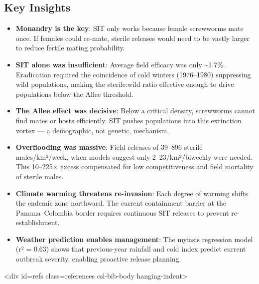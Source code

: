 \subsection{Key Insights}



\label{7549919537174593161}{}


\begin{itemize}
\item[1. ] \textbf{Monandry is the key}: SIT only works because female screwworms  mate once. If females could re-mate, sterile releases would need to  be vastly larger to reduce fertile mating probability.


\item[2. ] \textbf{SIT alone was insufficient}: Average field efficacy was only  {\textasciitilde}1.7\%. Eradication required the coincidence of cold winters  (1976–1980) suppressing wild populations, making the sterile:wild  ratio effective enough to drive populations below the Allee  threshold.


\item[3. ] \textbf{The Allee effect was decisive}: Below a critical density,  screwworms cannot find mates or hosts efficiently. SIT pushes  populations into this extinction vortex — a demographic, not  genetic, mechanism.


\item[4. ] \textbf{Overflooding was massive}: Field releases of 39–896 sterile  males/km²/week, when models suggest only 2–23/km²/biweekly were  needed. This 10–225× excess compensated for low competitiveness and  field mortality of sterile males.


\item[5. ] \textbf{Climate warming threatens re-invasion}: Each degree of warming  shifts the endemic zone northward. The current containment barrier  at the Panama–Colombia border requires continuous SIT releases to  prevent re-establishment.


\item[6. ] \textbf{Weather prediction enables management}: The myiasis regression  model (r² = 0.63) shows that previous-year rainfall and cold index  predict current outbreak severity, enabling proactive release  planning.

\end{itemize}


<div id={\textquotedbl}refs{\textquotedbl} class={\textquotedbl}references csl-bib-body hanging-indent{\textquotedbl}>



